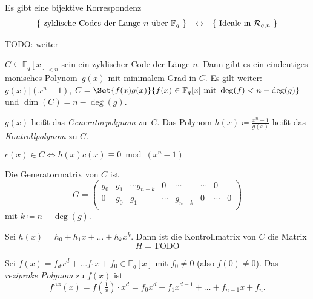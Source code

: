\documentclass{cheat-sheet}
\newcommand{\F}{\mathbb{F}} %
\newcommand{\divides}{|} %
\newcommand{\rez}{\mathrm{rez}} %
\begin{document}
\begin{satz}
  Es gibt eine bijektive Korrespondenz
  \[
    \begin{array}{r c l}
      \{ \text{ zyklische Codes der Länge $n$ über $\F_q$ } \} & \leftrightarrow & \{ \text{ Ideale in $\mathcal{R}_{q,n}$ } \}
    \end{array}
  \]
\end{satz}

TODO: weiter

\begin{satz}
  $C \subseteq \F_q[x]_{< n}$ sein ein zyklischer Code der Länge $n$.
  Dann gibt es ein eindeutiges monisches Polynom~$g(x)$ mit minimalem Grad in $C$.
  Es gilt weiter: $g(x) \divides (x^n - 1)$,
  $C = \Set{f(x) g(x)}{f(x) \in \F_q[x] \text{ mit } \deg(f) < n - \deg(g)}$ und $\dim(C) = n - \deg(g)$.
\end{satz}

\begin{defn}
  $g(x)$ heißt das \emph{Generatorpolynom} zu~$C$.
  Das Polynom $h(x) \coloneqq \tfrac{x^n - 1}{g(x)}$ heißt das \emph{Kontrollpolynom} zu $C$.
\end{defn}

\begin{lem}
  $c(x) \in C \iff h(x) c(x) \equiv 0 \bmod{(x^n - 1)}$
\end{lem}

\begin{bem}
  Die Generatormatrix von $C$ ist
  \[
    G = \begin{pmatrix}
      g_0 & g_1 & \cdots g_{n-k} & 0 & \cdots & \cdots & 0 \\
      0 & g_0 & g_1 & \cdots & g_{n-k} & 0 & \cdots & 0 \\
    \end{pmatrix}
  \]
  mit $k \coloneqq n - \deg(g)$.
\end{bem}

\begin{prop}
  Sei $h(x) = h_0 + h_1 x + \ldots + h_k x^k$.
  Dann ist die Kontrollmatrix von $C$ die Matrix
  \[
    H = \text{TODO}
  \]
\end{prop}


\begin{defn}
  Sei $f(x) = f_d x^d + \ldots f_1 x + f_0 \in \F_q[x]$ mit $f_0 \neq 0$ (also $f(0) \neq 0$).
  Das \emph{reziproke Polynom} zu $f(x)$ ist
  \[
    f^\rez(x) = f(\tfrac{1}{x}) \cdot x^d = f_0 x^d + f_1 x^{d-1} + \ldots + f_{n-1} x + f_n.
  \]
\end{defn}
\end{document}
